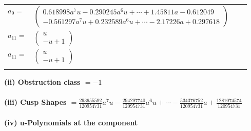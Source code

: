 \documentclass[1p]{elsarticle_modified}
\theoremstyle{definition}
\begin{document}
\begin{tabular}{m{7pt} m{180pt} m{7pt} m{180pt} }
\flushright $a_{9}=$&$\begin{pmatrix}0.618998 a^{7} u-0.290245 a^{6} u+\cdots+1.45811 a-0.612049\\-0.561297 a^{7} u+0.232589 a^{6} u+\cdots-2.17226 a+0.297618\end{pmatrix}$ \\
\flushright $a_{11}=$&$\begin{pmatrix}u\\- u+1\end{pmatrix}$\\ \flushright $a_{11}=$&$\begin{pmatrix}u\\- u+1\end{pmatrix}$\\&\end{tabular}
\flushleft \textbf{(ii) Obstruction class $= -1$}\\~\\
\flushleft \textbf{(iii) Cusp Shapes $= \frac{293655592}{120954731} a^7 u-\frac{294297740}{120954731} a^6 u+\cdots-\frac{534376752}{120954731} a+\frac{1281074574}{120954731}$}\\~\\
\newpage\renewcommand{\arraystretch}{1}
\flushleft \textbf{(iv) u-Polynomials at the component}\newline \\
\end{document}
